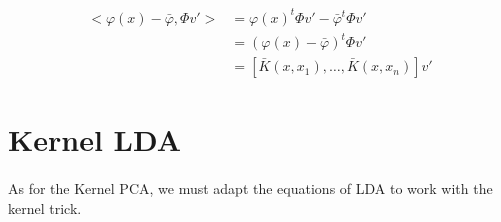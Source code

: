 \documentclass[a4paper]{article}
\begin{document}
\begin{align*}
<\varphi(x) - \bar{\varphi}, \Phi v'> &= \varphi(x)^t\Phi v' - \bar{\varphi}^t\Phi v' \\
&= (\varphi(x) - \bar{\varphi})^t\Phi v' \\
&= [\bar{K}(x, x_1), \ldots, \bar{K}(x, x_n)] v'
\end{align*}


\section*{Kernel LDA}

\paragraph{}
As for the Kernel PCA, we must adapt the equations of LDA to work with the kernel trick.
\end{document}
